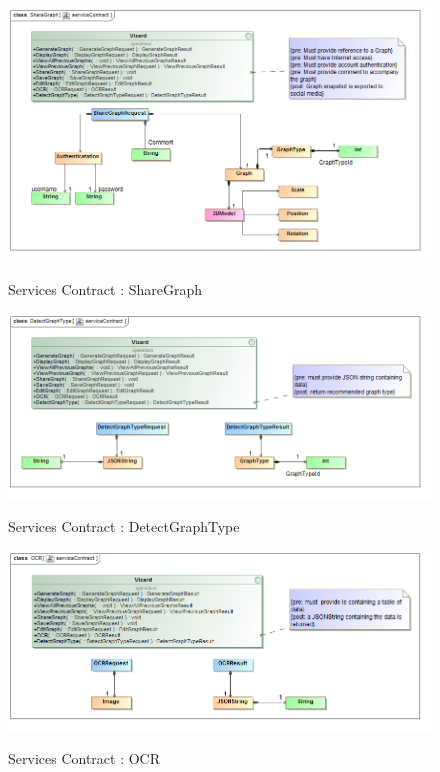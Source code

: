 \documentclass[a4paper,12pt]{article}
\begin{document}
	\begin{figure}[H]
		\includegraphics[width=\textwidth]{Images/class__ShareGraph__serviceContract.png}  \\
		\caption{Services Contract : ShareGraph}
	\end{figure}
	
	\begin{figure}[H]
		\includegraphics[width=\textwidth]{Images/class__DetectGraphType__serviceContract.png}  \\
		\caption{Services Contract : DetectGraphType}
	\end{figure}
	
	\begin{figure}[H]
		\includegraphics[width=\textwidth]{Images/class__OCR__serviceContract.png}  \\
		\caption{Services Contract : OCR}
	\end{figure}
\end{document}
